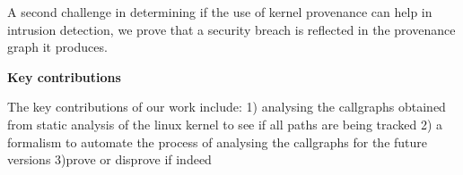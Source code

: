 A second challenge in determining if the use of kernel provenance can help in intrusion detection, we prove that a security breach is reflected in the provenance graph it produces. 
\vskip 0.1in

\textbf{Key contributions}

The key contributions of our work include: 1) analysing the callgraphs obtained from static analysis of the linux kernel to see if all paths are being tracked 2) a formalism to automate the process of analysing the callgraphs for the future versions 3)prove or disprove if indeed  

